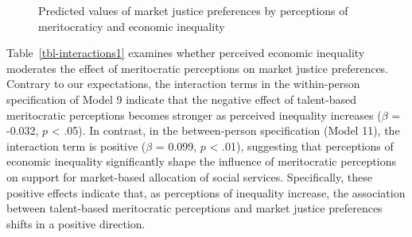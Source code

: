 \documentclass[
  12pt,
]{article}
\begin{document}
\begin{figure}[H]

\caption{\label{fig-interact}Predicted values of market justice
preferences by perceptions of meritocraticy and economic inequality}


\end{figure}%

Table~\ref{tbl-interactions1} examines whether perceived economic
inequality moderates the effect of meritocratic perceptions on market
justice preferences. Contrary to our expectations, the interaction terms
in the within-person specification of Model 9 indicate that the negative
effect of talent-based meritocratic perceptions becomes stronger as
perceived inequality increases (\(\beta\) = -0.032, \(p\) \textless{}
.05). In contrast, in the between-person specification (Model 11), the
interaction term is positive (\(\beta\) = 0.099, \(p\) \textless{} .01),
suggesting that perceptions of economic inequality significantly shape
the influence of meritocratic perceptions on support for market-based
allocation of social services. Specifically, these positive effects
indicate that, as perceptions of inequality increase, the association
between talent-based meritocratic perceptions and market justice
preferences shifts in a positive direction.
\end{document}
